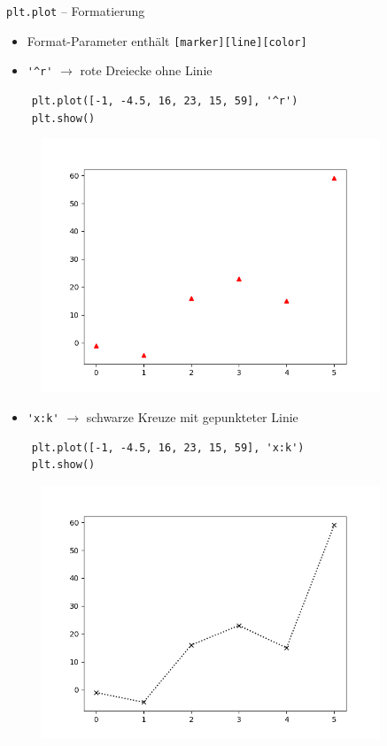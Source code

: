 \documentclass[utf8, smaller, c]{beamer}
\renewcommand{\tt}[1]{{\texttt{#1}}}
\begin{document}
\begin{frame}{\tt{plt.plot} -- Formatierung}	
	\begin{itemize}
		\item Format-Parameter enthält \tt{[marker][line][color]}
	\end{itemize}
	\begin{minipage}[t]{0.45\textwidth}
		\begin{itemize}
			\item \verb|'^r'| $\rightarrow$ rote Dreiecke ohne Linie
		\end{itemize}
		\begin{lstlisting}
	plt.plot([-1, -4.5, 16, 23, 15, 59], '^r')
	plt.show()
		\end{lstlisting}
		\begin{figure}
			\includegraphics[width=0.9\textwidth]{pics/plot3}
		\end{figure}
	\end{minipage}
	\begin{minipage}[t]{0.45\textwidth}
		\begin{itemize}
			\item \verb|'x:k'| $\rightarrow$ schwarze Kreuze mit gepunkteter Linie
		\end{itemize}
		\begin{lstlisting}
	plt.plot([-1, -4.5, 16, 23, 15, 59], 'x:k')
	plt.show()
		\end{lstlisting}
		\begin{figure}
			\includegraphics[width=0.9\textwidth]{pics/plot4}

\end{figure}
\end{minipage}
\end{frame}
\end{document}
